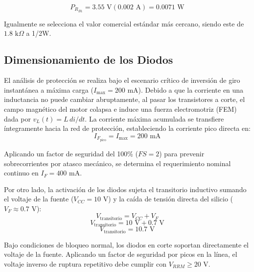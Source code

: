 \documentclass[journal]{IEEEtran}
\begin{document}
    \begin{equation*}
        P_{R_{B1}} = 3.55\text{ V} ( 0.002\text{ A} )= 0.0071\text{ W}
    \end{equation*}

    Igualmente se selecciona el valor comercial estándar más cercano, siendo este de $1.8\text{ k}\Omega$ a 1/2W.
    

    \subsection{Dimensionamiento de los Diodos}
    El análisis de protección se realiza bajo el escenario crítico de inversión de giro instantánea a máxima carga ($I_{\text{max}} = 200\text{ mA}$). 
    Debido a que la corriente en una inductancia no puede cambiar abruptamente, al pasar los transistores a corte, el campo magnético del motor 
    colapsa e induce una fuerza electromotriz (FEM) dada por $v_L(t) = L \, di/dt$. La corriente máxima acumulada 
    se transfiere íntegramente hacia la red de protección, estableciendo la corriente pico directa en:
    \begin{equation}
        I_{F_{\text{pico}}} = I_{\text{max}} = 200\text{ mA}
    \end{equation}

    Aplicando un factor de seguridad del 100\% ($FS = 2$) para prevenir sobrecorrientes por atasco mecánico, se determina el 
    requerimiento nominal continuo en $I_{F} = 400\text{ mA}$. 

    Por otro lado, la activación de los diodos sujeta el transitorio inductivo sumando el voltaje de 
    la fuente ($V_{CC} = 10\text{ V}$) y la caída de tensión directa del silicio ($V_F \approx 0.7\text{ V}$):
    \begin{equation*}
        V_{\text{transitorio}} = V_{CC} + V_{F}
    \end{equation*}
    \begin{equation*}
        V_{\text{transitorio}} = 10\text{ V} + 0.7\text{ V}
    \end{equation*}
    \begin{equation*}
        V_{\text{transitorio}} = 10.7\text{ V}
    \end{equation*}

    Bajo condiciones de bloqueo normal, los diodos en corte soportan directamente el voltaje de la fuente. Aplicando un factor de seguridad por picos en la línea, el voltaje inverso de ruptura repetitivo debe cumplir con $V_{RRM} \geq 20\text{ V}$. 
\end{document}
